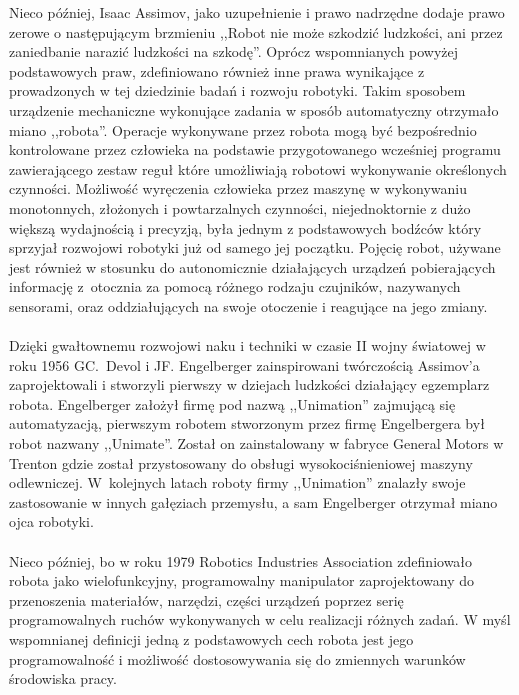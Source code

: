 Nieco później, Isaac Assimov, jako uzupełnienie i prawo nadrzędne dodaje prawo
zerowe o następującym brzmieniu ,,Robot nie może szkodzić ludzkości, ani przez
zaniedbanie narazić ludzkości na szkodę''\cite{website:robotyka-pl}. Oprócz
wspomnianych powyżej podstawowych praw, zdefiniowano również inne prawa
wynikające z prowadzonych w tej dziedzinie badań i rozwoju robotyki.
\newpage
Takim sposobem urządzenie mechaniczne wykonujące zadania w sposób automatyczny
otrzymało miano ,,robota''.\cite{website:asimo-pl} Operacje wykonywane przez
robota mogą być bezpośrednio kontrolowane przez człowieka na podstawie przygotowanego wcześniej
programu zawierającego zestaw reguł które umożliwiają robotowi wykonywanie
określonych czynności. Możliwość wyręczenia człowieka przez maszynę w
wykonywaniu monotonnych, złożonych i powtarzalnych czynności, niejednoktornie
z dużo większą wydajnością i precyzją, była jednym z podstawowych bodźców
który sprzyjał rozwojowi robotyki już od samego jej początku. Pojęcię robot,
używane jest również w stosunku do autonomicznie działających urządzeń
pobierających informację z~otocznia za pomocą różnego rodzaju czujników,
nazywanych sensorami, oraz oddziałujących na swoje otoczenie i reagujące na
jego zmiany. \\
\\
Dzięki gwałtownemu rozwojowi naku i techniki w czasie II wojny światowej w roku
1956 GC.~Devol i JF. Engelberger zainspirowani twórczością Assimov'a zaprojektowali i
stworzyli pierwszy w dziejach ludzkości działający egzemplarz robota\cite{website:robotyka-pl}.
Engelberger założył firmę pod nazwą ,,Unimation'' zajmującą się automatyzacją,
pierwszym robotem stworzonym przez firmę Engelbergera był robot nazwany
,,Unimate''. Został on zainstalowany w fabryce General Motors w Trenton gdzie
został przystosowany do obsługi wysokociśnieniowej maszyny odlewniczej.
W~kolejnych latach roboty firmy ,,Unimation'' znalazły swoje zastosowanie w
innych gałęziach przemysłu, a sam Engelberger otrzymał miano ojca
robotyki.\cite{website:robotyka-pl}\\
\\
Nieco później, bo w roku 1979 Robotics Industries Association 
zdefiniowało robota jako wielofunkcyjny, programowalny manipulator
zaprojektowany do przenoszenia materiałów, narzędzi, części urządzeń poprzez
serię programowalnych ruchów wykonywanych w celu realizacji różnych zadań.
W myśl wspomnianej definicji jedną z podstawowych cech robota jest jego
programowalność i możliwość dostosowywania się do zmiennych warunków środowiska
pracy. \\
